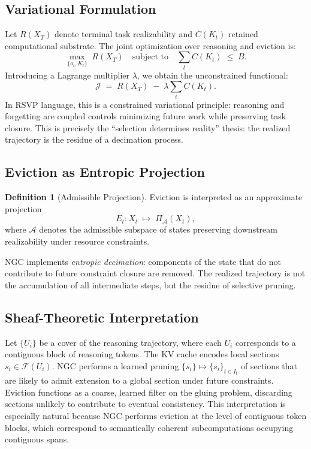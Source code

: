 \documentclass[11pt, letterpaper]{article}
\theoremstyle{plain}
\theoremstyle{definition}
\newtheorem{definition}[theorem]{Definition}
\theoremstyle{remark}
\newcommand{\FF}{\mathcal{F}}
\newcommand{\Adm}{\mathcal{A}}
\begin{document}
\subsection{Variational Formulation}

Let $R(X_T)$ denote terminal task realizability and $C(K_t)$ retained computational
substrate. The joint optimization over reasoning and eviction is:
\[
  \max_{\{o_t, K_t\}}\; R(X_T)
  \quad\text{subject to}\quad
  \sum_t C(K_t) \;\leq\; B.
\]
Introducing a Lagrange multiplier $\lambda$, we obtain the unconstrained functional:
\[
  \mathcal{J} \;=\; R(X_T) \;-\; \lambda\sum_t C(K_t).
\]
In RSVP language, this is a constrained variational principle: reasoning and forgetting
are coupled controls minimizing future work while preserving task closure. This is
precisely the ``selection determines reality'' thesis: the realized trajectory is the
residue of a decimation process.

\subsection{Eviction as Entropic Projection}

\begin{definition}[Admissible Projection]
Eviction is interpreted as an approximate projection
\[
  E_t: X_t \;\mapsto\; \Pi_{\Adm}(X_t),
\]
where $\Adm$ denotes the admissible subspace of states preserving downstream
realizability under resource constraints.
\end{definition}

NGC implements \emph{entropic decimation}: components of the state that do not
contribute to future constraint closure are removed. The realized trajectory is not the
accumulation of all intermediate steps, but the residue of selective pruning.

\subsection{Sheaf-Theoretic Interpretation}

Let $\{U_i\}$ be a cover of the reasoning trajectory, where each $U_i$ corresponds to
a contiguous block of reasoning tokens. The KV cache encodes local sections
$s_i \in \FF(U_i)$. NGC performs a learned pruning $\{s_i\} \mapsto \{s_i\}_{i \in I_t}$
of sections that are likely to admit extension to a global section under future
constraints. Eviction functions as a coarse, learned filter on the gluing problem,
discarding sections unlikely to contribute to eventual consistency. This interpretation
is especially natural because NGC performs eviction at the level of contiguous token
blocks, which correspond to semantically coherent subcomputations occupying contiguous
spans.
\end{document}
